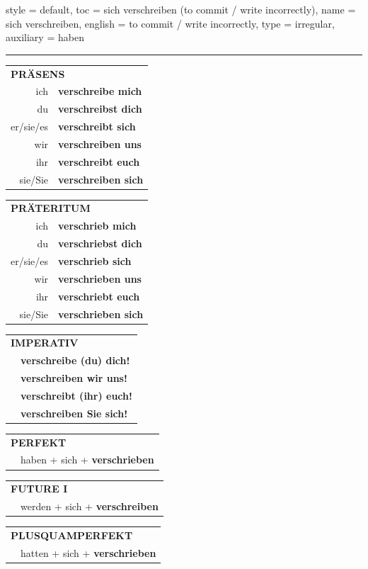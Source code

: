 \begin{verbentry}{
  style = {default},
  toc = {sich verschreiben (to commit / write incorrectly)},
  name = {sich verschreiben},
  english = {to commit / write incorrectly},
  type = {irregular},
  auxiliary = {haben}
}


\vspace{5pt}
\hrule
\vspace{5pt}

\begin{tabular}{rl}
\multicolumn{2}{l}{\textbf{PRÄSENS}}\\
ich & \textbf{verschreibe mich}\\
du & \textbf{verschreibst dich}\\
er/sie/es & \textbf{verschreibt sich}\\
wir & \textbf{verschreiben uns}\\
ihr & \textbf{verschreibt euch}\\
sie/Sie & \textbf{verschreiben sich}\\
\end{tabular}
\hfill
\begin{tabular}{rl}
\multicolumn{2}{l}{\textbf{PRÄTERITUM}}\\
ich & \textbf{verschrieb mich}\\
du & \textbf{verschriebst dich}\\
er/sie/es & \textbf{verschrieb sich}\\
wir & \textbf{verschrieben uns}\\
ihr & \textbf{verschriebt euch}\\
sie/Sie & \textbf{verschrieben sich}\\
\end{tabular}
\hfill
\begin{tabular}{rl}
\multicolumn{2}{l}{\textbf{IMPERATIV}}\\
& \textbf{verschreibe (du) dich!}\\
& \textbf{verschreiben wir uns!}\\
& \textbf{verschreibt (ihr) euch!}\\
& \textbf{verschreiben Sie sich!}\\
\end{tabular}

\vspace{10pt}

\begin{tabular}{rl}
\multicolumn{2}{l}{\textbf{PERFEKT}}\\
&haben + sich + \textbf{verschrieben}\\
\end{tabular}
\hfill
\begin{tabular}{rl}
\multicolumn{2}{l}{\textbf{FUTURE I}}\\
& werden + sich + \textbf{verschreiben}\\
\end{tabular}
\hfill
\begin{tabular}{rl}
\multicolumn{2}{l}{\textbf{PLUSQUAMPERFEKT}}\\
& hatten + sich + \textbf{verschrieben}\\
\end{tabular}


\end{verbentry}
